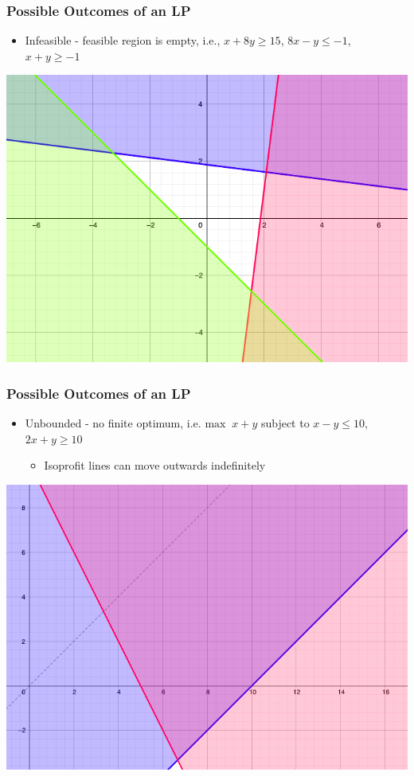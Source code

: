 \documentclass[12pt,handout]{beamer}
\begin{document}
\begin{frame}
\frametitle{Possible Outcomes of an LP}
\begin{itemize}
\item Infeasible - feasible region is empty, i.e., 
$x + 8y \ge 15$, $8x - y \le -1$, $x + y \ge -1$
\end{itemize}
\hfill\includegraphics[scale=0.25]{infeasible.png}\hspace*{\fill}
\end{frame}

\begin{frame}
\frametitle{Possible Outcomes of an LP}
\begin{itemize}
\item Unbounded - no finite optimum, i.e. $\mbox{max}\;\;x+y$ subject to $x - y \le 10$, $2x + y \ge 10$
\begin{itemize}
\item Isoprofit lines can move outwards indefinitely
\end{itemize}
\end{itemize}
\hfill\includegraphics[scale=0.3]{unbounded.png}\hspace*{\fill}
\end{frame}
\end{document}
